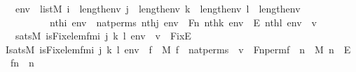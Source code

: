 \begin{isabellebody}
\ \ \ {\isachardoublequoteopen}env\ {\isasymin}\ list{\isacharparenleft}{\kern0pt}M{\isacharparenright}{\kern0pt}{\isachardoublequoteclose}\ {\isachardoublequoteopen}i\ {\isacharless}{\kern0pt}\ length{\isacharparenleft}{\kern0pt}env{\isacharparenright}{\kern0pt}{\isachardoublequoteclose}\ {\isachardoublequoteopen}j\ {\isacharless}{\kern0pt}\ length{\isacharparenleft}{\kern0pt}env{\isacharparenright}{\kern0pt}{\isachardoublequoteclose}\ {\isachardoublequoteopen}k\ {\isacharless}{\kern0pt}\ length{\isacharparenleft}{\kern0pt}env{\isacharparenright}{\kern0pt}{\isachardoublequoteclose}\ {\isachardoublequoteopen}l\ {\isacharless}{\kern0pt}\ length{\isacharparenleft}{\kern0pt}env{\isacharparenright}{\kern0pt}{\isachardoublequoteclose}\isanewline
\ \ \ \ \ \ \ \ \ \ {\isachardoublequoteopen}nth{\isacharparenleft}{\kern0pt}i{\isacharcomma}{\kern0pt}\ env{\isacharparenright}{\kern0pt}\ {\isacharequal}{\kern0pt}\ nat{\isacharunderscore}{\kern0pt}perms{\isachardoublequoteclose}\ {\isachardoublequoteopen}nth{\isacharparenleft}{\kern0pt}j{\isacharcomma}{\kern0pt}\ env{\isacharparenright}{\kern0pt}\ {\isacharequal}{\kern0pt}\ Fn{\isachardoublequoteclose}\ {\isachardoublequoteopen}nth{\isacharparenleft}{\kern0pt}k{\isacharcomma}{\kern0pt}\ env{\isacharparenright}{\kern0pt}\ {\isacharequal}{\kern0pt}\ E{\isachardoublequoteclose}\ {\isachardoublequoteopen}nth{\isacharparenleft}{\kern0pt}l{\isacharcomma}{\kern0pt}\ env{\isacharparenright}{\kern0pt}\ {\isacharequal}{\kern0pt}\ v{\isachardoublequoteclose}\ \isanewline
\ \ \ {\isachardoublequoteopen}sats{\isacharparenleft}{\kern0pt}M{\isacharcomma}{\kern0pt}\ is{\isacharunderscore}{\kern0pt}Fix{\isacharunderscore}{\kern0pt}elem{\isacharunderscore}{\kern0pt}fm{\isacharparenleft}{\kern0pt}i{\isacharcomma}{\kern0pt}\ j{\isacharcomma}{\kern0pt}\ k{\isacharcomma}{\kern0pt}\ l{\isacharparenright}{\kern0pt}{\isacharcomma}{\kern0pt}\ env{\isacharparenright}{\kern0pt}\ {\isasymlongleftrightarrow}\ v\ {\isasymin}\ Fix{\isacharparenleft}{\kern0pt}E{\isacharparenright}{\kern0pt}{\isachardoublequoteclose}\ \isanewline
%
\isadelimproof
%
\endisadelimproof
%
\isatagproof
{}\isamarkupfalse%
\ {\isacharminus}{\kern0pt}\ \isanewline
\ \ \isamarkupfalse%
\ I{}{\isacharcolon}{\kern0pt}{\isachardoublequoteopen}sats{\isacharparenleft}{\kern0pt}M{\isacharcomma}{\kern0pt}\ is{\isacharunderscore}{\kern0pt}Fix{\isacharunderscore}{\kern0pt}elem{\isacharunderscore}{\kern0pt}fm{\isacharparenleft}{\kern0pt}i{\isacharcomma}{\kern0pt}\ j{\isacharcomma}{\kern0pt}\ k{\isacharcomma}{\kern0pt}\ l{\isacharparenright}{\kern0pt}{\isacharcomma}{\kern0pt}\ env{\isacharparenright}{\kern0pt}\ {\isasymlongleftrightarrow}\ {\isacharparenleft}{\kern0pt}{\isasymexists}f\ {\isasymin}\ M{\isachardot}{\kern0pt}\ f\ {\isasymin}\ nat{\isacharunderscore}{\kern0pt}perms\ {\isasymand}\ v\ {\isacharequal}{\kern0pt}\ Fn{\isacharunderscore}{\kern0pt}perm{\isacharprime}{\kern0pt}{\isacharparenleft}{\kern0pt}f{\isacharparenright}{\kern0pt}\ {\isasymand}\ {\isacharparenleft}{\kern0pt}{\isasymforall}n\ {\isasymin}\ M{\isachardot}{\kern0pt}\ n\ {\isasymin}\ E\ {\isasymlongrightarrow}\ f{\isacharbackquote}{\kern0pt}n\ {\isacharequal}{\kern0pt}\ n{\isacharparenright}{\kern0pt}{\isacharparenright}{\kern0pt}{\isachardoublequoteclose}\ \isanewline

\end{isabellebody}
